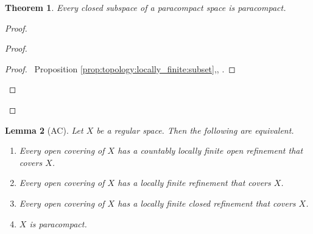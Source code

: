 \documentclass{report}
\let\qed\relax
\newtheorem{lm}{Lemma}[section]
\newtheorem{thm}[lm]{Theorem}
\theoremstyle{definition}
\begin{document}
\begin{thm}
  Every closed subspace of a paracompact space is paracompact.
\end{thm}

\begin{proof}
  \pf
  \begin{proof}
    \begin{proof}
      \pf\ Proposition \ref{prop:topology:locally_finite:subset},, .
    \end{proof}
  \end{proof}
  \qed
\end{proof}

\begin{lm}[AC]
  Let $X$ be a regular space. Then the following are equivalent.
  \begin{enumerate}
    \item
    \label{one}
    Every open covering of $X$ has a countably locally finite open refinement that covers $X$.
    \item
    \label{two}
    Every open covering of $X$ has a locally finite refinement that covers $X$.
    \item
    \label{three}
    Every open covering of $X$ has a locally finite closed refinement that covers $X$.
    \item
    \label{four}
    $X$ is paracompact.
  \end{enumerate}
\end{lm}
\end{document}
